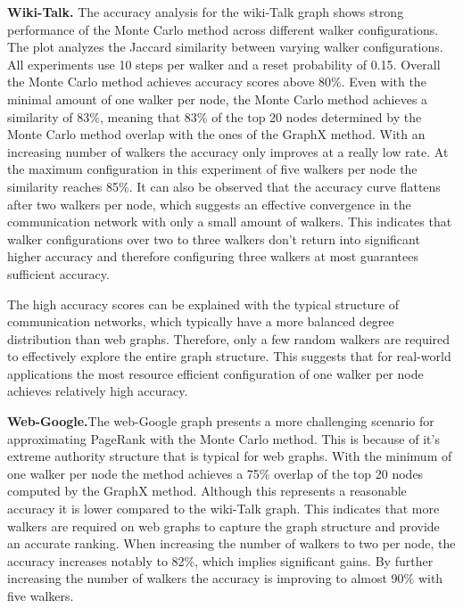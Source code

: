 \textbf{Wiki-Talk.} The accuracy analysis for the wiki-Talk graph shows strong performance of the Monte Carlo method across different walker configurations. The plot analyzes the Jaccard similarity between varying walker configurations. All experiments use 10 steps per walker and a reset probability of 0.15. Overall the Monte Carlo method achieves accuracy scores above 80\%. Even with the minimal amount of one walker per node, the Monte Carlo method achieves a similarity of 83\%, meaning that 83\% of the top 20 nodes determined by the Monte Carlo method overlap with the ones of the GraphX method. With an increasing number of walkers the accuracy only improves at a really low rate. At the maximum configuration in this experiment of five walkers per node the similarity reaches 85\%. It can also be observed that the accuracy curve flattens after two walkers per node, which suggests an effective convergence in the communication network with only a small amount of walkers. This indicates that walker configurations over two to three walkers don't return into significant higher accuracy and therefore configuring three walkers at most guarantees sufficient accuracy.\par
The high accuracy scores can be explained with the typical structure of communication networks, which typically have a more balanced degree distribution than web graphs. Therefore, only a few random walkers are required to effectively explore the entire graph structure. This suggests that for real-world applications the most resource efficient configuration of one walker per node achieves relatively high accuracy.\par
\textbf{Web-Google.}The web-Google graph presents a more challenging scenario for approximating PageRank with the Monte Carlo method. This is because of it's extreme authority structure that is typical for web graphs. With the minimum of one walker per node the method achieves a 75\% overlap of the top 20 nodes computed by the GraphX method. Although this represents a reasonable accuracy it is lower compared to the wiki-Talk graph. This indicates that more walkers are required on web graphs to capture the graph structure and provide an accurate ranking. When increasing the number of walkers to two per node, the accuracy increases notably to 82\%, which implies significant gains. By further increasing the number of walkers the accuracy is improving to almost 90\% with five walkers.\par
